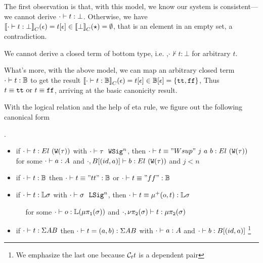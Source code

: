 The first observation is that, with this model, we know our system is consistent---we cannot derive $ {\cdot} \vdash {t} : {\bot} $. Otherwise, we have ${{\llbracket {\ensuremath{ {\cdot} \vdash {t} : {\bot} }} \rrbracket}_C}(\epsilon) = {t}\!\left[{\epsilon}\right] \in {{\llbracket {\bot} \rrbracket}_C}(\star) = \emptyset$, that is an element in an empty set, a contradiction.

\begin{theorem}[Consistency]
  We cannot derive a closed term of bottom type, i.e. ,$\cdot \not \vdash t : \bot$ for arbitrary $t$.
\end{theorem}

What's more, with the above model, we can map an arbitrary closed term $ {\cdot} \vdash {t} : {\mathbb{B}} $ to get the result ${{\llbracket {\ensuremath{ {\cdot} \vdash {t} : {\mathbb{B}} }} \rrbracket}_C}(\epsilon) = {t}\!\left[{\epsilon}\right] \in {\ensuremath{\mathbb{B}}}\!\left[{\epsilon}\right] = \{\texttt{tt}, \texttt{ff}\}$, Thus $t \equiv \texttt{tt} \text{ or } t \equiv\texttt{ff}$, arriving at the basic canonicity result.


With the logical relation and the help of eta rule, we figure out the following canonical form
\begin{theorem}.
  \begin{itemize}
    \item if $ {\cdot} \vdash {t} : {El~(\texttt{W}({\tau}))} $ with $ {\cdot} \vdash {\tau} \ \ \texttt{WSig}^{n} $, then $ {\cdot} \vdash {t \equiv "Wsup"~j~a~b} : {El~(\texttt{W}({\tau}))} $ for some $ {\cdot} \vdash {a} : {A} $ and $ {\cdot, B[(id, a)]} \vdash {b} : {El~(\texttt{W}({\tau}))} $ and $j < n$
    \item if $ {\cdot} \vdash {t} : {\mathbb{B}} $ then $ {\cdot} \vdash {t \equiv "tt"} : {\mathbb{B}} $ or $ {\cdot} \vdash {t \equiv "ff"} : {\mathbb{B}} $ 
    \item if $ {\cdot} \vdash {t} : {\mathbb{L}\sigma} $ with $ {\cdot} \vdash {\sigma} \ \ \texttt{LSig}^{n} $, then $ {\cdot} \vdash {t \equiv \ensuremath{\mu^+({o},{t})}} : {\mathbb{L}\sigma} $ 
    
      $\quad$ for some $ {\cdot} \vdash {o} : {\mathbb{L}(\mu\pi_{\texttt{1}}({\sigma}))} $ and $ {\cdot, \nu\pi_{\texttt{2}}({\sigma})} \vdash {t} : {\mu\pi_{\texttt{2}}({\sigma})} $
    \item if $ {\cdot} \vdash {t} : {\Sigma A B} $ then $ {\cdot} \vdash {t = (a, b)} : {\Sigma A B} $ with $ {\cdot} \vdash {a} : {A} $ and $ {\cdot} \vdash {b} : {B[(id, a)]} $
    \footnote{We emphasize the last one because $\mathcal{C}_t t$ is a dependent pair}
  \end{itemize}
\end{theorem}

